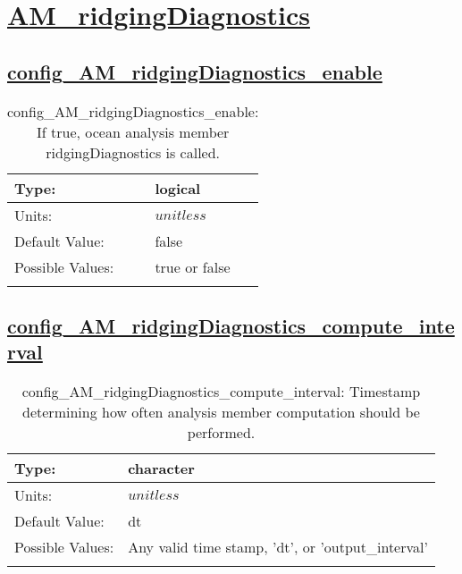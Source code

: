 \section[AM\_ridgingDiagnostics]{\hyperref[sec:nm_tab_AM_ridgingDiagnostics]{AM\_ridgingDiagnostics}}
\label{sec:nm_sec_AM_ridgingDiagnostics}
\subsection[config\_AM\_ridgingDiagnostics\_enable]{\hyperref[sec:nm_tab_AM_ridgingDiagnostics]{config\_AM\_ridgingDiagnostics\_enable}}
\label{subsec:nm_sec_config_AM_ridgingDiagnostics_enable}
\begin{center}
\begin{longtable}{| p{2.0in} || p{4.0in} |}
    \hline
    Type: & logical \\
    \hline
    Units: & $unitless$ \\
    \hline
    Default Value: & false \\
    \hline
    Possible Values: & true or false \\
    \hline
    \caption{config\_AM\_ridgingDiagnostics\_enable: If true, ocean analysis member ridgingDiagnostics is called.}
\end{longtable}
\end{center}
\subsection[config\_AM\_ridgingDiagnostics\_compute\_interval]{\hyperref[sec:nm_tab_AM_ridgingDiagnostics]{config\_AM\_ridgingDiagnostics\_compute\_interval}}
\label{subsec:nm_sec_config_AM_ridgingDiagnostics_compute_interval}
\begin{center}
\begin{longtable}{| p{2.0in} || p{4.0in} |}
    \hline
    Type: & character \\
    \hline
    Units: & $unitless$ \\
    \hline
    Default Value: & dt \\
    \hline
    Possible Values: & Any valid time stamp, 'dt', or 'output\_interval' \\
    \hline
    \caption{config\_AM\_ridgingDiagnostics\_compute\_interval: Timestamp determining how often analysis member computation should be performed.}
\end{longtable}
\end{center}
